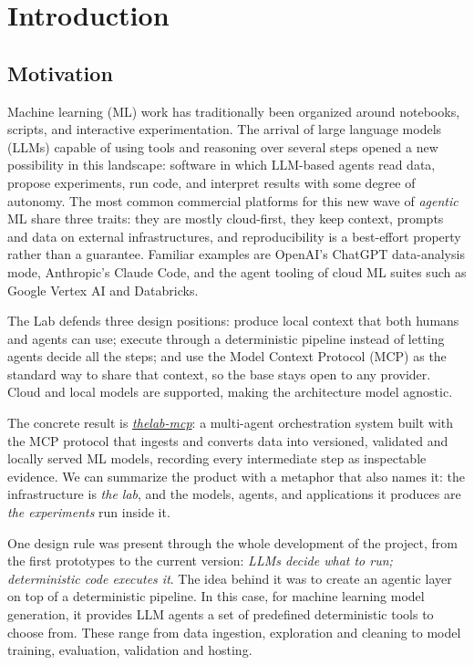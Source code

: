 \chapter{Introduction}
\label{ch:introduction}

\section{Motivation}
\label{sec:motivation}

Machine learning (ML) work has traditionally been organized around notebooks, scripts, and interactive experimentation. The arrival of large language models (LLMs) capable of using tools and reasoning over several steps opened a new possibility in this landscape: software in which LLM-based agents read data, propose experiments, run code, and interpret results with some degree of autonomy. The most common commercial platforms for this new wave of \emph{agentic} ML share three traits: they are mostly cloud-first, they keep context, prompts and data on external infrastructures, and reproducibility is a best-effort property rather than a guarantee. Familiar examples are OpenAI's ChatGPT data-analysis mode, Anthropic's Claude Code, and the agent tooling of cloud ML suites such as Google Vertex AI and Databricks.

The Lab defends three design positions: produce local context that both humans and agents can use; execute through a deterministic pipeline instead of letting agents decide all the steps; and use the Model Context Protocol (MCP) as the standard way to share that context, so the base stays open to any provider. Cloud and local models are supported, making the architecture model agnostic.

The concrete result is \href{https://github.com/ArturoJKB/the-lab-mcp-tfg/tree/main}{\emph{thelab-mcp}}: a multi-agent orchestration system built with the MCP protocol that ingests and converts data into versioned, validated and locally served ML models, recording every intermediate step as inspectable evidence. We can summarize the product with a metaphor that also names it: the infrastructure is \emph{the lab}, and the models, agents, and applications it produces are \emph{the experiments} run inside it.

One design rule was present through the whole development of the project, from the first prototypes to the current version: \emph{LLMs decide what to run; deterministic code executes it}. The idea behind it was to create an agentic layer on top of a deterministic pipeline. In this case, for machine learning model generation, it provides LLM agents a set of predefined deterministic tools to choose from. These range from data ingestion, exploration and cleaning to model training, evaluation, validation and hosting.

